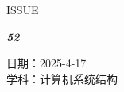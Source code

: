 \documentclass[UTF8]{ctexart}
\newcommand\Black[1]{\textcolor[gray]{0.3}{#1}}
\newcommand\Brown[1]{\textcolor[HTML]{998A4E}{#1}}
\newcommand\IssueNumber{52}
\newcommand\Date{2025-4-17}
\newcommand\Subject{计算机系统结构}
\begin{document}
\begin{figure}[H]
\hspace{1cm}
\begin{minipage}[t]{0.3\textwidth}
\centering
    \Brown{\Genshin ISSUE}

    \vspace{-0.6cm}
    \Huge \Issue\slshape\bfseries\Black{\IssueNumber}
\end{minipage}
\hfill
\begin{minipage}[t]{0.35\textwidth}
\centering
    \Brown{日期：\Date} \\
\vspace{-0.1cm}
    \Brown{学科：\Subject} \\
\end{minipage}
\hspace{0.8cm}
\end{figure}
\end{document}
